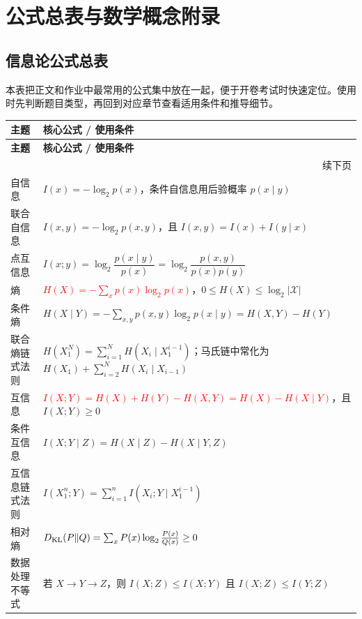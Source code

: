 \section{公式总表与数学概念附录}

\subsection{信息论公式总表}

本表把正文和作业中最常用的公式集中放在一起，便于开卷考试时快速定位。使用时先判断题目类型，再回到对应章节查看适用条件和推导细节。

{\scriptsize
\renewcommand{\arraystretch}{1.25}
\setlength{\LTleft}{0pt}
\setlength{\LTright}{0pt}
\begin{longtable}{@{}p{}p{}@{}}
\toprule
\textbf{主题} & \textbf{核心公式 / 使用条件} \\
\midrule
\endfirsthead
\toprule
\textbf{主题} & \textbf{核心公式 / 使用条件} \\
\midrule
\endhead
\midrule
\multicolumn{2}{r}{\footnotesize 续下页}\\
\bottomrule
\endfoot
\bottomrule
\endlastfoot
自信息 & $I(x)=-\log_2p(x)$，条件自信息用后验概率 $p(x\mid y)$ \\
\midrule
联合自信息 & $I(x,y)=-\log_2p(x,y)$，且 $I(x,y)=I(x)+I(y\mid x)$ \\
\midrule
点互信息 & $I(x;y)=\log_2\dfrac{p(x\mid y)}{p(x)}=\log_2\dfrac{p(x,y)}{p(x)p(y)}$ \\
\midrule
熵 & \textcolor{Red}{$H(X)=-\sum_xp(x)\log_2p(x)$}，$0\le H(X)\le\log_2|\mathcal X|$ \\
\midrule
条件熵 & $H(X\mid Y)=-\sum_{x,y}p(x,y)\log_2p(x\mid y)=H(X,Y)-H(Y)$ \\
\midrule
联合熵链式法则 & $H(X_1^N)=\sum_{i=1}^NH(X_i\mid X_1^{i-1})$；马氏链中常化为 $H(X_1)+\sum_{i=2}^NH(X_i\mid X_{i-1})$ \\
\midrule
互信息 & \textcolor{Red}{$I(X;Y)=H(X)+H(Y)-H(X,Y)=H(X)-H(X\mid Y)$}，且 $I(X;Y)\ge0$ \\
\midrule
条件互信息 & $I(X;Y\mid Z)=H(X\mid Z)-H(X\mid Y,Z)$ \\
\midrule
互信息链式法则 & $I(X_1^n;Y)=\sum_{i=1}^n I(X_i;Y\mid X_1^{i-1})$ \\
\midrule
相对熵 & \textcolor{Red}{$D_{\mathrm{KL}}(P\|Q)=\sum_xP(x)\log_2\frac{P(x)}{Q(x)}\ge0$} \\
\midrule
数据处理不等式 & 若 $X\to Y\to Z$，则 $I(X;Z)\le I(X;Y)$ 且 $I(X;Z)\le I(Y;Z)$ \\

\end{longtable}}
